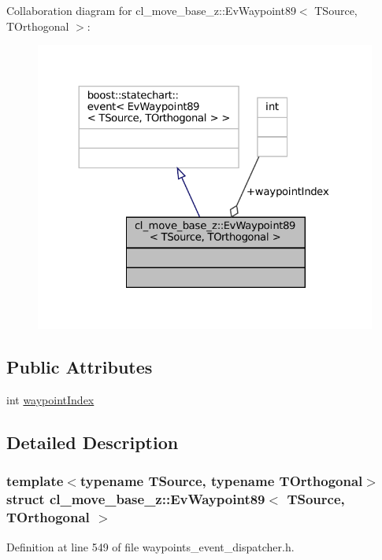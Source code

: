 Collaboration diagram for cl\+\_\+move\+\_\+base\+\_\+z\+:\+:Ev\+Waypoint89$<$ T\+Source, T\+Orthogonal $>$\+:
\nopagebreak
\begin{figure}[H]
\begin{center}
\leavevmode
\includegraphics[width=324pt]{structcl__move__base__z_1_1EvWaypoint89__coll__graph}
\end{center}
\end{figure}
\subsection*{Public Attributes}
\begin{DoxyCompactItemize}
\item 
int \hyperlink{structcl__move__base__z_1_1EvWaypoint89_a1fcb57c519d7e3469bb1242352b04bd4}{waypoint\+Index}
\end{DoxyCompactItemize}


\subsection{Detailed Description}
\subsubsection*{template$<$typename T\+Source, typename T\+Orthogonal$>$\newline
struct cl\+\_\+move\+\_\+base\+\_\+z\+::\+Ev\+Waypoint89$<$ T\+Source, T\+Orthogonal $>$}



Definition at line 549 of file waypoints\+\_\+event\+\_\+dispatcher.\+h.



